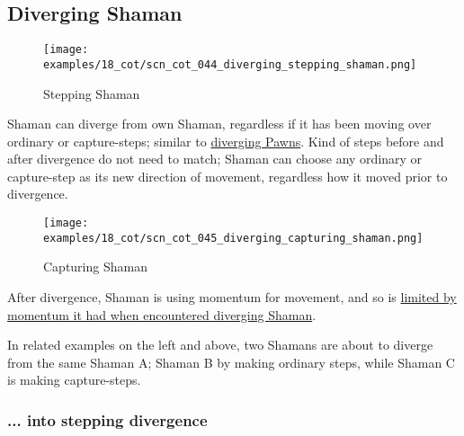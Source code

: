 \subsection*{Diverging Shaman}
\label{sec:Conquest of Tlalocan/Shaman/Movement/Diverging Shaman}

\vspace*{-0.7\baselineskip}
\noindent
\begin{wrapfigure}[10]{l}{0.4\textwidth}
\centering
\texttt{[image: examples/18\_cot/scn\_cot\_044\_diverging\_stepping\_shaman.png]}
\vspace*{-0.4\baselineskip}
\caption{Stepping Shaman}
\label{fig:scn_cot_044_diverging_stepping_shaman}
\end{wrapfigure}
Shaman can diverge from own Shaman, regardless if it has been moving over ordinary
or capture-steps; similar to
\hyperref[fig:scn_cot_034_diverging_pawn_init]{diverging Pawns}. \newline
\indent
Kind of steps before and after divergence do not need to match; Shaman can choose
any ordinary or capture-step as its new direction of movement, regardless how it
moved prior to divergence.

\noindent
\begin{wrapfigure}[11]{l}{0.4\textwidth}
\centering
\texttt{[image: examples/18\_cot/scn\_cot\_045\_diverging\_capturing\_shaman.png]}
\vspace*{-0.4\baselineskip}
\caption{Capturing Shaman}
\label{fig:scn_cot_045_diverging_capturing_shaman}
\end{wrapfigure}
After divergence, Shaman is using momentum for movement, and so is
\hyperref[fig:scn_cot_031_own_shaman_is_divergent_end]{limited by momentum it had when encountered diverging Shaman}.

In related examples on the left and above, two Shamans are about to diverge from the
same Shaman A; Shaman B by making ordinary steps, while Shaman C is making capture-steps.

\clearpage %

\subsubsection*{... into stepping divergence}
\label{sec:Conquest of Tlalocan/Divergence/... into stepping divergence}

